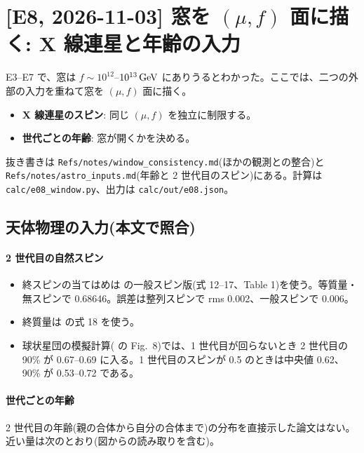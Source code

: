 \section{[E8, 2026-11-03] 窓を $(\mu,f)$ 面に描く: X 線連星と年齢の入力}\label{sec:e08}

E3--E7 で、窓は $f\sim10^{12}$--$10^{13}\,\mathrm{GeV}$ にありうるとわかった。ここでは、二つの外部の入力を重ねて窓を $(\mu,f)$ 面に描く。
\begin{itemize}
\item \textbf{X 線連星のスピン}: 同じ $(\mu,f)$ を独立に制限する。
\item \textbf{世代ごとの年齢}: 窓が開くかを決める。
\end{itemize}
抜き書きは \texttt{Refs/notes/window\_consistency.md}(ほかの観測との整合)と \texttt{Refs/notes/astro\_inputs.md}(年齢と 2 世代目のスピン)にある。計算は \texttt{calc/e08\_window.py}、出力は \texttt{calc/out/e08.json}。

\subsection{天体物理の入力(本文で照合)}

\paragraph{2 世代目の自然スピン}
\begin{itemize}
\item 終スピンの当てはめは  の一般スピン版(式 12--17、Table 1)を使う。等質量・無スピンで 0.68646。誤差は整列スピンで rms 0.002、一般スピンで 0.006。
\item 終質量は  の式 18 を使う。
\item 球状星団の模擬計算( の Fig.~8)では、1 世代目が回らないとき 2 世代目の 90\% が 0.67--0.69 に入る。1 世代目のスピンが 0.5 のときは中央値 0.62、90\% が 0.53--0.72 である。
\end{itemize}

\paragraph{世代ごとの年齢}
2 世代目の年齢(親の合体から自分の合体まで)の分布を直接示した論文はない。近い量は次のとおり(図からの読み取りを含む)。

